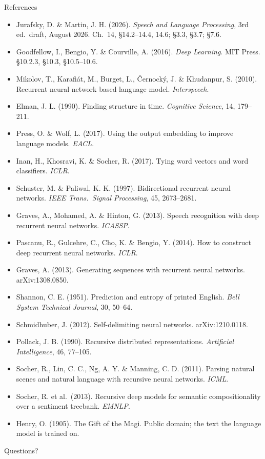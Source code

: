 \documentclass[aspectratio=169, 11pt]{beamer}
\newcommand{\nosrc}{}       %
\begin{document}
\begin{frame}[allowframebreaks]{References}
  \nosrc
  \scriptsize
  \begin{itemize}\itemsep0.3em
    \item Jurafsky, D. \& Martin, J. H. (2026). \emph{Speech and Language
          Processing}, 3rd ed.\ draft, August 2026. Ch.~14, \S14.2--14.4,
          14.6; \S3.3, \S3.7; \S7.6.
    \item Goodfellow, I., Bengio, Y. \& Courville, A. (2016). \emph{Deep
          Learning}. MIT Press. \S10.2.3, \S10.3, \S10.5--10.6.
    \item Mikolov, T., Karafi\'at, M., Burget, L., \v{C}ernock\'y, J. \&
          Khudanpur, S. (2010). Recurrent neural network based language
          model. \emph{Interspeech}.
    \item Elman, J. L. (1990). Finding structure in time. \emph{Cognitive
          Science}, 14, 179--211.
    \item Press, O. \& Wolf, L. (2017). Using the output embedding to
          improve language models. \emph{EACL}.
    \item Inan, H., Khosravi, K. \& Socher, R. (2017). Tying word vectors
          and word classifiers. \emph{ICLR}.
    \item Schuster, M. \& Paliwal, K. K. (1997). Bidirectional recurrent
          neural networks. \emph{IEEE Trans.\ Signal Processing}, 45,
          2673--2681.
    \item Graves, A., Mohamed, A. \& Hinton, G. (2013). Speech recognition
          with deep recurrent neural networks. \emph{ICASSP}.
    \item Pascanu, R., Gulcehre, C., Cho, K. \& Bengio, Y. (2014). How to
          construct deep recurrent neural networks. \emph{ICLR}.
    \item Graves, A. (2013). Generating sequences with recurrent neural
          networks. arXiv:1308.0850.
    \item Shannon, C. E. (1951). Prediction and entropy of printed
          English. \emph{Bell System Technical Journal}, 30, 50--64.
    \item Schmidhuber, J. (2012). Self-delimiting neural networks.
          arXiv:1210.0118.
    \item Pollack, J. B. (1990). Recursive distributed representations.
          \emph{Artificial Intelligence}, 46, 77--105.
    \item Socher, R., Lin, C. C., Ng, A. Y. \& Manning, C. D. (2011).
          Parsing natural scenes and natural language with recursive
          neural networks. \emph{ICML}.
    \item Socher, R. et al.\ (2013). Recursive deep models for semantic
          compositionality over a sentiment treebank. \emph{EMNLP}.
    \item Henry, O. (1905). The Gift of the Magi. Public domain; the text
          the language model is trained on.
  \end{itemize}
\end{frame}

\begin{frame}[standout]
  \nosrc
  Questions?
\end{frame}
\end{document}
